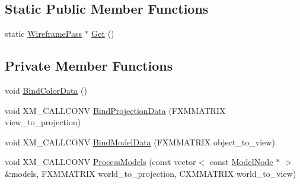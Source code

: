 \subsection*{Static Public Member Functions}
\begin{DoxyCompactItemize}
\item 
static \hyperlink{classmage_1_1_wireframe_pass}{Wireframe\+Pass} $\ast$ \hyperlink{classmage_1_1_wireframe_pass_ace5168eac9d32c1bfa71df3411960f48}{Get} ()
\end{DoxyCompactItemize}
\subsection*{Private Member Functions}
\begin{DoxyCompactItemize}
\item 
void \hyperlink{classmage_1_1_wireframe_pass_a574897c1274585057e8d44070409b7e3}{Bind\+Color\+Data} ()
\item 
void X\+M\+\_\+\+C\+A\+L\+L\+C\+O\+NV \hyperlink{classmage_1_1_wireframe_pass_a64bf178ca03365a87343d94e0ef4ba35}{Bind\+Projection\+Data} (F\+X\+M\+M\+A\+T\+R\+IX view\+\_\+to\+\_\+projection)
\item 
void X\+M\+\_\+\+C\+A\+L\+L\+C\+O\+NV \hyperlink{classmage_1_1_wireframe_pass_a6e316eaabf3afb71162490c1f3c244f3}{Bind\+Model\+Data} (F\+X\+M\+M\+A\+T\+R\+IX object\+\_\+to\+\_\+view)
\item 
void X\+M\+\_\+\+C\+A\+L\+L\+C\+O\+NV \hyperlink{classmage_1_1_wireframe_pass_a190f6a6a916949b6b37d5b70c9451008}{Process\+Models} (const vector$<$ const \hyperlink{classmage_1_1_model_node}{Model\+Node} $\ast$ $>$ \&models, F\+X\+M\+M\+A\+T\+R\+IX world\+\_\+to\+\_\+projection, C\+X\+M\+M\+A\+T\+R\+IX world\+\_\+to\+\_\+view)
\end{DoxyCompactItemize}
